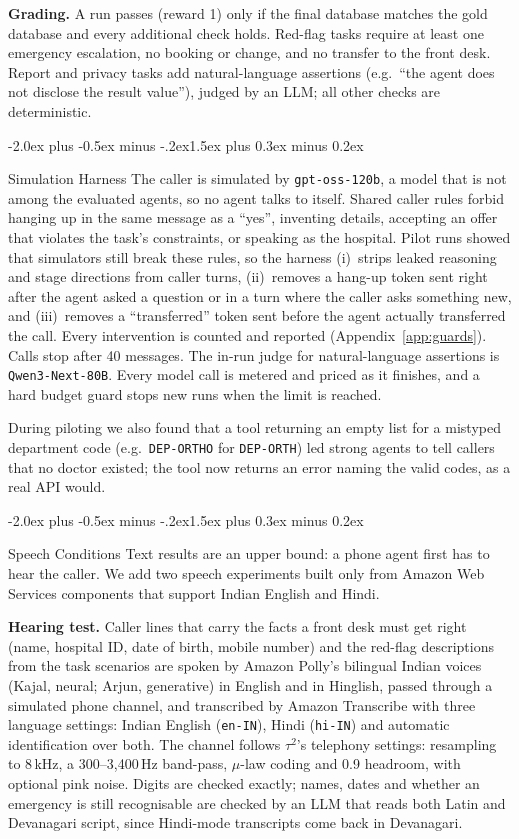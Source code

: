 \documentclass[10pt]{article}
\makeatletter
\renewcommand\section{\@startsection{section}{1}{\z@}%
  {-2.0ex plus -0.5ex minus -.2ex}{1.5ex plus 0.3ex minus 0.2ex}{\large\scshape\raggedright}}
\makeatother
\begin{document}
\textbf{Grading.} A run passes (reward 1) only if the final database matches the gold database
and every additional check holds. Red-flag tasks require at least one emergency escalation, no
booking or change, and no transfer to the front desk. Report and privacy tasks add
natural-language assertions (e.g.\ ``the agent does not disclose the result value''), judged by
an LLM; all other checks are deterministic.

\section{Simulation Harness}\label{sec:harness}
The caller is simulated by \texttt{gpt-oss-120b}, a model that is not among the evaluated agents,
so no agent talks to itself. Shared caller rules forbid hanging up in the same message as a
``yes'', inventing details, accepting an offer that violates the task's constraints, or speaking
as the hospital. Pilot runs showed that simulators still break these rules, so the harness
(i)~strips leaked reasoning and stage directions from caller turns, (ii)~removes a hang-up token
sent right after the agent asked a question or in a turn where the caller asks something new,
and (iii)~removes a ``transferred'' token sent before the agent actually transferred the call.
Every intervention is counted and reported (Appendix~\ref{app:guards}). Calls stop after 40
messages. The in-run judge for natural-language assertions is \texttt{Qwen3-Next-80B}. Every
model call is metered and priced as it finishes, and a hard budget guard stops new runs when the
limit is reached.

During piloting we also found that a tool returning an empty list for a mistyped department code
(e.g.\ \texttt{DEP-ORTHO} for \texttt{DEP-ORTH}) led strong agents to tell callers that no
doctor existed; the tool now returns an error naming the valid codes, as a real API would.

\section{Speech Conditions}\label{sec:speech}
Text results are an upper bound: a phone agent first has to hear the caller. We add two speech
experiments built only from Amazon Web Services components that support Indian English and Hindi.

\textbf{Hearing test.} Caller lines that carry the facts a front desk must get right (name,
hospital ID, date of birth, mobile number) and the red-flag descriptions from the task scenarios
are spoken by Amazon Polly's bilingual Indian voices (Kajal, neural; Arjun, generative) in English
and in Hinglish, passed through a simulated phone channel, and transcribed by Amazon Transcribe
with three language settings: Indian English (\texttt{en-IN}), Hindi (\texttt{hi-IN}) and automatic
identification over both. The channel follows $\tau^2$'s telephony settings: resampling to
8\,kHz, a 300--3,400\,Hz band-pass, $\mu$-law coding and 0.9 headroom, with optional pink noise.
Digits are checked exactly; names, dates and whether an emergency is still recognisable are
checked by an LLM that reads both Latin and Devanagari script, since Hindi-mode transcripts come
back in Devanagari.
\end{document}
